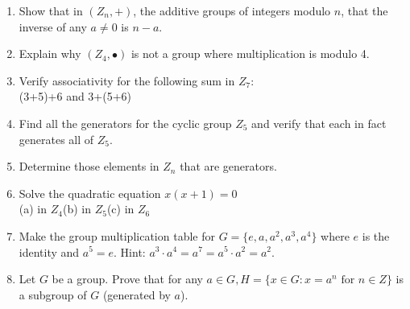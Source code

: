 \documentclass[12pt]{article}
\theoremstyle{definition}
\begin{document}
\begin{enumerate}
\item Show that in $(Z_n,+)$, the additive groups of integers modulo $n$, that the inverse of any $a\neq0$ is $n-a$.
\item Explain why $(Z_4,\bullet)$ is not a group where multiplication is modulo 4.
\item Verify associativity for the following sum in $Z_7$:\\
(3+5)+6 and 3+(5+6)
\item Find all the generators for the cyclic group $Z_5$ and verify that each in fact generates all of $Z_5$.
\item Determine those elements in $Z_n$ that are generators.
\item Solve the quadratic equation $x(x+1)=0$\\
(a) in $Z_4$\qquad (b) in $Z_5$\qquad (c) in $Z_6$
\item Make the group multiplication table for $G=\{e,a, a^2,a^3,a^4\}$ where $e$ is the identity and $a^5=e$.  Hint: $a^3\cdot a^4=a^7=a^5\cdot a^2 = a^2$.
\item Let $G$ be a group.  Prove that for any $a\in G, H=\{x\in G: x=a^n \text{ for }n\in Z\}$ is a subgroup of $G$ (generated by $a$).
\end{enumerate}
\newpage
\end{document}
